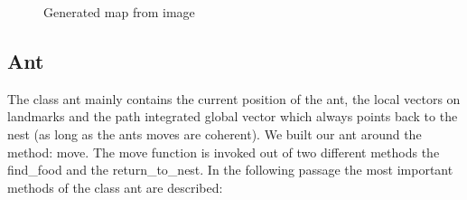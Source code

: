 \documentclass[11pt]{article}
\begin{document}
\begin{figure}[h!]
   \centering
   \caption[Generating a map from image]{Generated map from image}
\label{fig3}
\end{figure}

\subsection{Ant}

The class ant mainly contains the current position of the ant, the local vectors on landmarks and the path integrated global vector which always points back to the nest (as long as the ants moves are coherent).
We built our ant around the method: move. The move function is invoked out of two different methods the find\_food and the return\_to\_nest. In the following passage the most important methods of the class ant are described:
\end{document}
